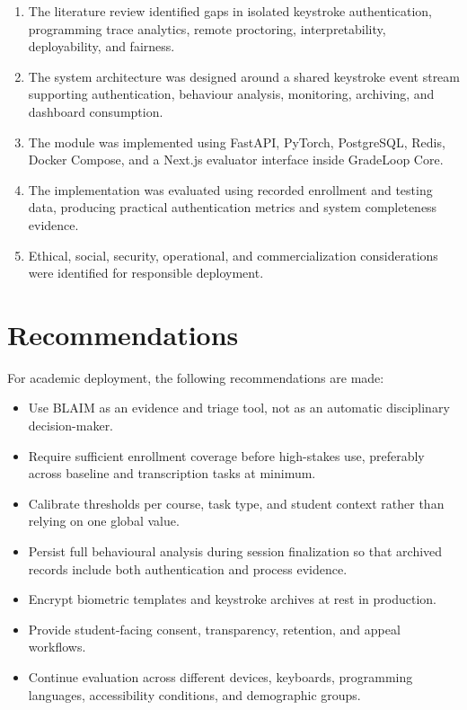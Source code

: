 \begin{enumerate}
  \item The literature review identified gaps in isolated keystroke authentication, programming trace analytics, remote proctoring, interpretability, deployability, and fairness.
  \item The system architecture was designed around a shared keystroke event stream supporting authentication, behaviour analysis, monitoring, archiving, and dashboard consumption.
  \item The module was implemented using FastAPI, PyTorch, PostgreSQL, Redis, Docker Compose, and a Next.js evaluator interface inside GradeLoop Core.
  \item The implementation was evaluated using recorded enrollment and testing data, producing practical authentication metrics and system completeness evidence.
  \item Ethical, social, security, operational, and commercialization considerations were identified for responsible deployment.
\end{enumerate}

\section{Recommendations}
\label{sec:recommendations}

For academic deployment, the following recommendations are made:

\begin{itemize}
  \item Use BLAIM as an evidence and triage tool, not as an automatic disciplinary decision-maker.
  \item Require sufficient enrollment coverage before high-stakes use, preferably across baseline and transcription tasks at minimum.
  \item Calibrate thresholds per course, task type, and student context rather than relying on one global value.
  \item Persist full behavioural analysis during session finalization so that archived records include both authentication and process evidence.
  \item Encrypt biometric templates and keystroke archives at rest in production.
  \item Provide student-facing consent, transparency, retention, and appeal workflows.
  \item Continue evaluation across different devices, keyboards, programming languages, accessibility conditions, and demographic groups.
\end{itemize}

